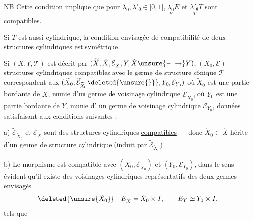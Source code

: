 \uline{NB} Cette condition implique que pour $\lambda_0,\lambda'_0\in]0,1]$,
$\underset{E}{\lambda_0}E$ et $\underset{T}{\lambda'_0}T$ sont compatibles.

Si $T$ est aussi cylindrique, la condition
envisagée de compatibilité de deux structures
cylindriques est symétrique.

Si $(X,Y,\mathcal T)$ est décrit par $(\widetilde X,\dot X,\mathcal E_{\dot X},Y,\dot X\unsure{-|\to}Y)$,
  $(X_0,\mathcal E)$  structures cylindriques compatibles
avec le germe de structure cônique $\mathcal T$ correspondent
aux 
$(\widetilde X_0,\widetilde{\mathcal E}_{\widetilde X_0}\deleted{\unsure{\}}},Y_0,\mathcal E_{Y_0})$
où $\widetilde X_0$ est une partie bordante de  $\widetilde X$, munie
d'un germe de voisinage cylindrique $\widetilde{\mathcal E}_{\widetilde X_0}$,
où $Y_0$ est une partie bordante de $Y$, munie d'
un germe de  voisinage cylindrique
$\mathcal E_{Y_0}$,  données satisfaisant aux conditions
suivantes :

a) $\widetilde{\mathcal E}_{\widetilde X_0}$ et $\mathcal E_{\dot X}$ sont des
 structures cylindriques
\uline{compatibles} --- donc $\dot X_0\subset\dot X$
hérite d'un
germe de structure cylindrique  (induit par
$\widetilde{\mathcal E}_{\widetilde X_0}$)

b) Le morphisme
est compatible
avec $(\dot X_0,\mathcal E_{\dot X_0})$ et $(Y_0,\mathcal E_{Y_0})$, dans le sens
évident 
qu'il existe des voisinages cylindriques
représentatifs des deux germes envisagés
\[
\deleted{\unsure{\dot X_0}}\quad
E_{\dot X}=\dot X_0\times I,\qquad E_Y\simeq Y_0\times I,
\]
tels que
